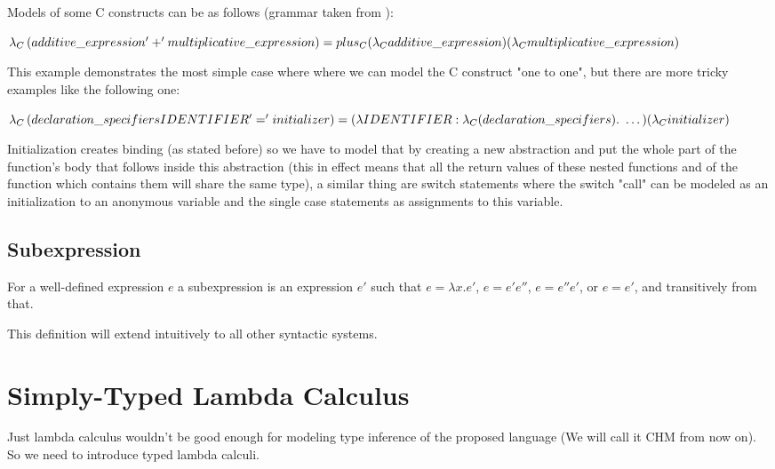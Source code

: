 Models of some C constructs can be as follows (grammar taken from ): %


$\lambda_C\left(additive\_expression '+' multiplicative\_expression\right) = \\ plus_C (\lambda_C additive\_expression) (\lambda_C multiplicative\_expression)$

This example demonstrates the most simple case where where we can model the C construct "one to one",
but there are more tricky examples like the following one:

$\lambda_C\left(declaration\_specifiers IDENTIFIER '=' initializer\right) = \\ (\lambda IDENTIFIER : \lambda_C(declaration\_specifiers) .\ \dots) (\lambda_C initializer)$

Initialization creates binding (as stated before) so we have to model that by creating a new abstraction and put the whole
part of the function's body that follows inside this abstraction (this in effect means that all the return values of these nested functions
and of the function which contains them will share the same type), a similar thing are switch statements where the switch "call" can be modeled
as an initialization to an anonymous variable and the single case statements as assignments to this variable.

\subsection{Subexpression}

For a well-defined expression $e$ a subexpression is an expression $e'$ such that $e = \lambda x . e'$, $e = e' e''$, $e = e'' e'$, or $e = e'$, and transitively from that.

This definition will extend intuitively to all other syntactic systems.

\section{Simply-Typed Lambda Calculus}

Just lambda calculus wouldn't be good enough for modeling type inference of the proposed language (We will call it CHM from now on).
So we need to introduce typed lambda calculi.


